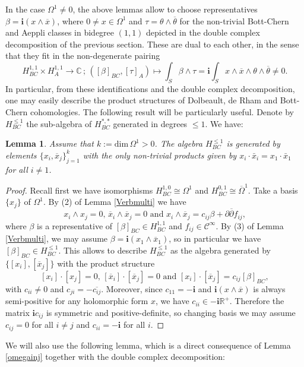 \documentclass[a4paper]{amsart}
\newtheorem{lemm}[theo]{Lemma}
\theoremstyle{definition}
\newcommand{\CC}{\mathbb{C}}
\newcommand{\RR}{\mathbb{R}}
\newcommand{\Cc}{\mathcal{C}}
\newcommand{\ov}{\overline}
\newcommand{\del}{\partial}
\newcommand{\delb}{{\overline\partial}}
\newcommand{\lra}{\longrightarrow}
\begin{document}
In the case $\Omega^1\neq 0$, the above lemmas allow to choose representatives
$\beta=\mathbf{i}(x\wedge\ov x)$, where $0\neq x\in\Omega^1$ and $\tau=\theta\wedge \ov \theta$ for the non-trivial Bott-Chern and Aeppli classes in bidegree $(1,1)$ depicted in the double complex decomposition of the previous section. These are dual to each other, in the sense that they fit in the non-degenerate pairing
\[H^{1,1}_{BC}\times H^{1,1}_A\lra \CC\,;\,([\beta]_{BC},[\tau]_A)\mapsto \int_S \beta\wedge\tau =\mathbf{i}\int_S x\wedge \ov x\wedge \theta\wedge\ov \theta\neq 0.\]
In particular, from these identifications and the double complex decomposition, one may easily describe the
product structures of Dolbeault, de Rham and Bott-Chern cohomologies.
The following result will be particularly useful.
Denote by $H_{BC}^{\leq 1}$ the sub-algebra of $H_{BC}^{*,*}$ generated in degrees $\leq 1$. We have:
\begin{lemm}\label{Bottchernbasis}
Assume that $k:=\mathrm{dim\,}\Omega^1>0$.
The algebra $H_{BC}^{\leq 1}$ is generated by elements
$\{x_i,\ov x_j\}_{j=1}^k$ with the only non-trivial products given by
$x_i\cdot\bar{x}_i=x_1\cdot \bar{x}_1$ for all $i\neq 1$.
\end{lemm}
\begin{proof}
Recall first we have isomorphisms $H^{1,0}_{BC}\cong \Omega^1$ and $H^{0,1}_{BC}\cong \ov\Omega^1$.
Take a basis $\{x_j\}$ of $\Omega^1$. By (2) of Lemma \ref{Verbmulti} we have
\[x_i\wedge x_j=0,\, \ov x_i\wedge \ov x_j=0\text{ and }x_i\wedge \ov x_j=c_{ij}\beta+\del\delb f_{ij},\]
where $\beta$ is a representative of $[\beta]_{BC}\in H^{1,1}_{BC}$ and $f_{ij}\in\Cc^\infty$.
By (3) of Lemma \ref{Verbmulti}, we may assume $\beta=\mathbf{i}(x_1\wedge \ov x_1)$,
so in particular we have $[\beta]_{BC}\in H^{\leq 1}_{BC}$. This allows to describe $H^{\leq 1}_{BC}$ as the algebra generated by
$\{[x_i],[\ov x_j]\}$ with the product structure
\[[x_i]\cdot[x_j]=0,\, [\ov x_i]\cdot [\ov x_j]=0\text{ and }[x_i]\cdot [\ov x_j]=c_{ij}[\beta]_{BC},\]
with $c_{ii}\neq 0$ and $c_{ji}=-\ov{c_{ij}}$.
Moreover, since $c_{11}=-\mathbf{i}$ and $\mathbf{i}(x\wedge \ov x)$ is always semi-positive for any holomorphic form $x$, we have
$c_{ii}\in -\mathbf{i}\RR^+$.
Therefore the matrix $\mathbf{i}c_{ij}$ is symmetric and positive-definite, so changing basis we may assume $c_{ij}=0$ for all $i\neq j$ and $c_{ii}=-\mathbf{i}$ for all $i$.
\end{proof}




We will also use the following lemma, which is a direct
 consequence of Lemma \ref{omegainj} together with the double complex decomposition:
\end{document}
